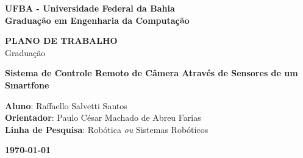 \documentclass[12pt,a4paper]{article}
\begin{document}

\begin{titlepage}
\thispagestyle{empty}
\begin{center}
\large{\bf{UFBA - Universidade Federal da Bahia}} \\
\large{\bf{Graduação em Engenharia da Computação}} \\
\end{center}
\vfill

\centering
\textbf{{\LARGE PLANO DE TRABALHO}}  \\ \vspace{0.5cm}
{\LARGE Graduação}
\vfill




\textbf{{\Large Sistema de Controle Remoto de Câmera Através de Sensores de um Smartfone}} \\ %
\vfill
\begin{flushleft}
\textbf{Aluno}: Raffaello Salvetti Santos \hfill{}\\
\textbf{Orientador}: Paulo César Machado de Abreu Farias\hfill{}\\
\textbf{Linha de Pesquisa}: Robótica {\it ou} Sistemas Robóticos \hfill{}\\
\end{flushleft}

\vfill


\begin{center}
\large{\bf{\today}}
\end{center}
\end{titlepage}


\end{document}
